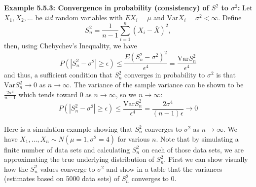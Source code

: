 \documentclass[11pt,]{article}
\def\Xbar{\bar{ X}}
\def\sumin{\sum_{i=1}^n}
\def\Var{\mbox{Var}}
\begin{document}
\noindent\textbf{Example 5.5.3: Convergence in probability (consistency) of $S^2$ to $\sigma^2$:}
Let \(X_1, X_2, \ldots\) be \(iid\) random variables with
\(E X_i = \mu\) and \(\Var X_i = \sigma^2 < \infty\). Define
\[S_n^2 = \frac{1}{n-1} \sumin (X_i - \Xbar)^2,\] then, using
Chebychev's Inequality, we have
\[P(|S_n^2 - \sigma^2| \geq \epsilon) \leq \frac{E(S_n^2 - \sigma^2)^2}{\epsilon^4} = \frac{\Var S_n^2}{\epsilon^4}\]
and thus, a sufficient condition that \(S_n^2\) converges in probability
to \(\sigma^2\) is that \(\Var S_n^2\to 0\) as \(n\to\infty\). The
variance of the sample variance can be shown to be
\(\frac{2\sigma^4}{n-1}\) which tends toward 0 as \(n \to \infty\), so
we \(n \to \infty\):
\[P(|S_n^2 - \sigma^2| \geq \epsilon) \leq \frac{\Var S_n^2}{\epsilon^4} = \frac{2\sigma^4}{(n-1)\epsilon}\to 0\]

Here is a simulation example showing that \(S_n^2\) converges to
\(\sigma^2\) as \(n\to\infty\). We have
\(X_1, \ldots, X_n \sim N(\mu = 1, \sigma^2 = 4)\) for various \(n\).
Note that by simulating a finite number of data sets and calculating
\(S_n^2\) on each of those data sets, we are approximating the true
underlying distribution of \(S_n^2\). First we can show visually how the
\(S_n^2\) values converge to \(\sigma^2\) and show in a table that the
variances (estimates based on 5000 data sets) of \(S_n^2\) converges to
0.
\end{document}
